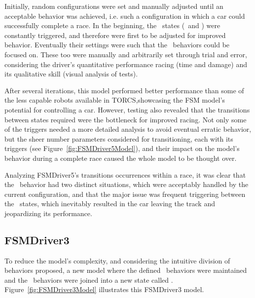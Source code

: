 Initially, random configurations were set and manually adjusted until an acceptable behavior was achieved, i.e. such a configuration in which a car could successfully complete a race. In the beginning, the \recovery~states (\OT~and \St) were constantly triggered, and therefore were first to be adjusted for improved behavior. Eventually their settings were such that the \racing~behaviors could be focused on. These too were manually and arbitrarily set through trial and error, considering the driver's quantitative performance racing (time and damage) and its qualitative skill (visual analysis of tests).

After several iterations, this model performed better performance than some of the less capable robots available in TORCS,showcasing the FSM model's potential for controlling a car. However, testing also revealed that the transitions between states required were the bottleneck for improved racing. Not only some of the triggers needed a more detailed analysis to avoid eventual erratic behavior, but the sheer number parameters considered for transitioning, each with its triggers (see Figure~\ref{fig:FSMDriver5Model}), and their impact on the model's behavior during a complete race caused the whole model to be thought over.

Analyzing FSMDriver5's transitions occurrences within a race, it was clear that the \recovery~behavior had two distinct situations, which were acceptably handled by the current configuration, and that the major issue was frequent triggering between the \racing~states, which inevitably resulted in the car leaving the track and jeopardizing its performance.

\subsection{FSMDriver3}%
To reduce the model's complexity, and considering the intuitive division of behaviors proposed, a new model where the defined \recovery~behaviors were maintained and the \racing~behaviors were joined into a new state called \IT. Figure~\ref{fig:FSMDriver3Model} illustrates this FSMDriver3 model.

